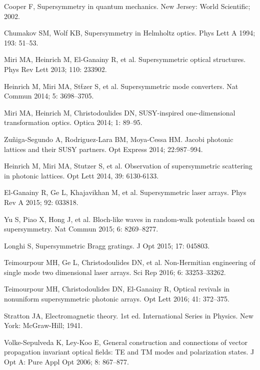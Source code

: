 \documentclass[12pt]{iopart}
\begin{document}
\begin{thebibliography}{100}
	
	
	 Cooper F,
	Supersymmetry in quantum mechanics. New Jersey: World Scientific; 2002.
	
	 Chumakov SM, Wolf KB,
	Supersymmetry in Helmholtz optics.
	Phys Lett A 1994;  193: 51--53.
	
	 Miri MA, Heinrich M, El-Ganainy R, et al.
	Supersymmetric optical structures.
	Phys Rev Lett 2013;   110: 233902.
	
	 Heinrich M, Miri MA, St\"tzer S, et al.
	Supersymmetric mode converters.
	Nat  Commun 2014;   5: 3698--3705.
	
	 Miri MA, Heinrich M, Christodoulides DN,
	SUSY-inspired one-dimensional transformation optics.
	Optica 2014;   1: 89--95.
	
	 Zu\~niga-Segundo A, Rodriguez-Lara BM,  Moya-Cessa HM.
	Jacobi photonic lattices and their SUSY partners.
	Opt Express 2014;  22:987--994.
	
	 Heinrich M, Miri MA, Stutzer S, et al.
	Observation of supersymmetric scattering in photonic lattices.
	Opt  Lett 2014,  39: 6130-6133.
	
	 El-Ganainy R, Ge L, Khajavikhan M, et al.
	Supersymmetric laser arrays.
	Phys Rev A 2015;   92: 033818.
	
	 Yu S, Piao X, Hong J, et al.
	Bloch-like waves in random-walk potentials based on supersymmetry.
	Nat Commun 2015;   6: 8269--8277.
	
	 Longhi S,
	Supersymmetric Bragg gratings.
	J Opt 2015;   17: 045803.
	
	 Teimourpour MH, Ge L, Christodoulides DN, et al.
	Non-Hermitian engineering of single mode two dimensional laser arrays.
	Sci Rep 2016;   6: 33253--33262.
	
	 Teimourpour MH, Christodoulides DN, El-Ganainy R,
	Optical revivals in nonuniform supersymmetric photonic arrays.
	Opt Lett 2016;   41: 372--375.
	
	
	 Stratton JA,
	Electromagnetic theory. 1st ed.
	International Series in Physics. New York: McGraw-Hill; 1941.
	
	 Volke-Sepulveda K, Ley-Koo E,
	General construction and connections of vector propagation invariant optical fields: TE and TM modes and polarization states.
	J Opt A: Pure Appl Opt 2006;  8: 867--877.
	

\end{thebibliography}
\end{document}
